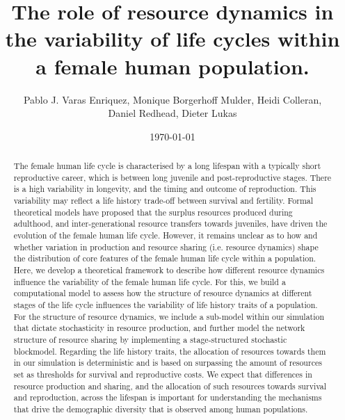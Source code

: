 \documentclass{article}
\title{The role of resource dynamics in the variability of life cycles within a female human population.}
\author{Pablo J. Varas Enriquez, Monique Borgerhoff Mulder, Heidi Colleran,
\\
Daniel Redhead, Dieter Lukas}
\date{\today}
\begin{document}
\maketitle

\begin{abstract}
    The female human life cycle is characterised by a long lifespan with a typically short reproductive career, which is between long juvenile and post-reproductive stages. There is a high variability in longevity, and the timing and outcome of reproduction. This variability may reflect a life history trade-off between survival and fertility. Formal theoretical models have proposed that the surplus resources produced during adulthood, and inter-generational resource transfers towards juveniles, have driven the evolution of the female human life cycle. However, it remains unclear as to how and whether variation in production and resource sharing (i.e. resource dynamics) shape the distribution of core features of the female human life cycle within a population. Here, we develop a theoretical framework to describe how different resource dynamics influence the variability of the female human life cycle. For this, we build a computational model to assess how the structure of resource dynamics at different stages of the life cycle influences the variability of life history traits of a population. For the structure of resource dynamics, we include a sub-model within our simulation that dictate stochasticity in resource production, and further  model the network structure of resource sharing by implementing a stage-structured stochastic blockmodel. Regarding the life history traits, the allocation of resources towards them in our simulation is deterministic and is based on surpassing the amount of resources set as thresholds for survival and reproductive costs. We expect that differences in resource production and sharing, and the allocation of such resources towards survival and reproduction, across the lifespan is important for understanding the mechanisms that drive the demographic diversity that is observed among human populations.
    \end{abstract}
\end{document}
